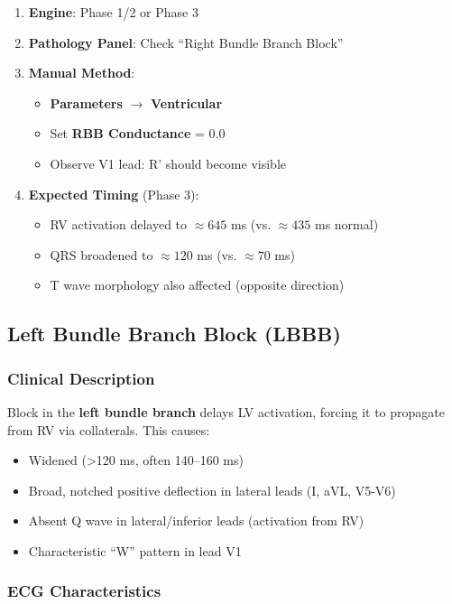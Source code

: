 \documentclass[12pt,a4paper,oneside]{book}
\begin{document}
\begin{enumerate}
    \item \textbf{Engine}: Phase 1/2 or Phase 3
    \item \textbf{Pathology Panel}: Check ``Right Bundle Branch Block''
    \item \textbf{Manual Method}:
    \begin{itemize}
        \item \textbf{Parameters} $\to$ \textbf{Ventricular}
        \item Set \textbf{RBB Conductance} = 0.0
        \item Observe V1 lead: R' should become visible
    \end{itemize}
    \item \textbf{Expected Timing} (Phase 3):
    \begin{itemize}
        \item RV activation delayed to $\approx 645$ ms (vs. $\approx 435$ ms normal)
        \item QRS broadened to $\approx 120$ ms (vs. $\approx 70$ ms)
        \item T wave morphology also affected (opposite direction)
    \end{itemize}
\end{enumerate}

\subsection{Left Bundle Branch Block (LBBB)}

\subsubsection{Clinical Description}

Block in the \textbf{left bundle branch} delays LV activation, forcing it to propagate from RV via collaterals. This causes:

\begin{itemize}
    \item Widened \QRS (>120 ms, often 140–160 ms)
    \item Broad, notched positive deflection in lateral leads (I, aVL, V5-V6)
    \item Absent Q wave in lateral/inferior leads (activation from RV)
    \item Characteristic ``W'' pattern in lead V1
\end{itemize}

\subsubsection{ECG Characteristics}
\end{document}
